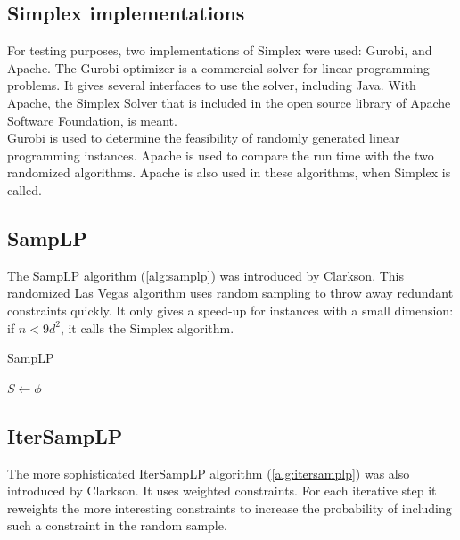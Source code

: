 \documentclass[nocopyrightspace]{acm_proc_article-sp}
\begin{document}
                         

\subsection{Simplex implementations}
For testing purposes, two implementations of Simplex were used: Gurobi, and Apache. The Gurobi optimizer is a commercial solver for linear programming problems. It gives several interfaces to use the solver, including Java. With Apache, the Simplex Solver that is included in the open source library of Apache Software Foundation, is meant.\\
Gurobi is used to determine the feasibility of randomly generated linear programming instances. Apache is used to compare the run time with the two randomized algorithms. Apache is also used in these algorithms, when Simplex is called.

\subsection{SampLP}
The SampLP algorithm (\ref{alg:samplp}) was introduced by Clarkson\cite{clarkson1988vegas}. This randomized Las Vegas algorithm uses random sampling to throw away redundant constraints quickly. It only gives a speed-up for instances with a small dimension: if $n<9d^2$, it calls the Simplex algorithm. 


\begin{algorithm}[h]
\label{alg:samplp}
\caption{SampLP}
$S \gets \phi$\;
\end{algorithm}

\subsection{IterSampLP}
The more sophisticated IterSampLP algorithm (\ref{alg:itersamplp}) was also introduced by Clarkson\cite{clarkson1995vegas}. It uses weighted constraints. For each iterative step it reweights the more interesting constraints to increase the probability of including such a constraint in the random sample.
\end{document}
